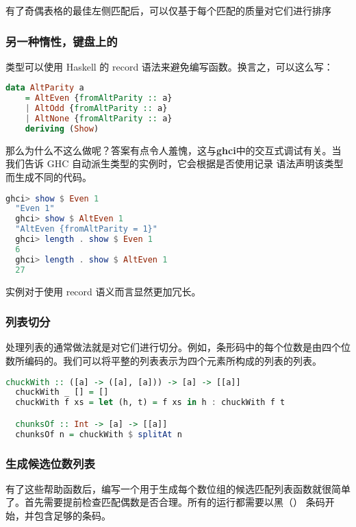 \documentclass[./main.tex]{subfiles}
\begin{document}
有了奇偶表格的最佳左侧匹配后，可以仅基于每个匹配的质量对它们进行排序

\subsubsection*{另一种惰性，键盘上的}

类型可以使用 Haskell 的 record 语法来避免编写函数。换言之，可以这么写：

\begin{lstlisting}[language=Haskell]
  data AltParity a
    = AltEven {fromAltParity :: a}
    | AltOdd {fromAltParity :: a}
    | AltNone {fromAltParity :: a}
    deriving (Show)
\end{lstlisting}

那么为什么不这么做呢？答案有点令人羞愧，这与\textbf{ghci}中的交互式调试有关。当我们告诉 GHC 自动派生类型的实例时，它会根据是否使用记录
语法声明该类型而生成不同的代码。

\begin{lstlisting}[language=Haskell]
  ghci> show $ Even 1
  "Even 1"
  ghci> show $ AltEven 1
  "AltEven {fromAltParity = 1}"
  ghci> length . show $ Even 1
  6
  ghci> length . show $ AltEven 1
  27
\end{lstlisting}

实例对于使用 record 语义而言显然更加冗长。

\subsubsection*{列表切分}

处理列表的通常做法就是对它们进行切分。例如，条形码中的每个位数是由四个位数所编码的。我们可以将平整的列表表示为四个元素所构成的列表的列表。

\begin{lstlisting}[language=Haskell]
  chuckWith :: ([a] -> ([a], [a])) -> [a] -> [[a]]
  chuckWith _ [] = []
  chuckWith f xs = let (h, t) = f xs in h : chuckWith f t

  chunksOf :: Int -> [a] -> [[a]]
  chunksOf n = chuckWith $ splitAt n
\end{lstlisting}

\subsubsection*{生成候选位数列表}

有了这些帮助函数后，编写一个用于生成每个数位组的候选匹配列表函数就很简单了。首先需要提前检查匹配偶数是否合理。所有的运行都需要以黑（）
条码开始，并包含足够的条码。
\end{document}
